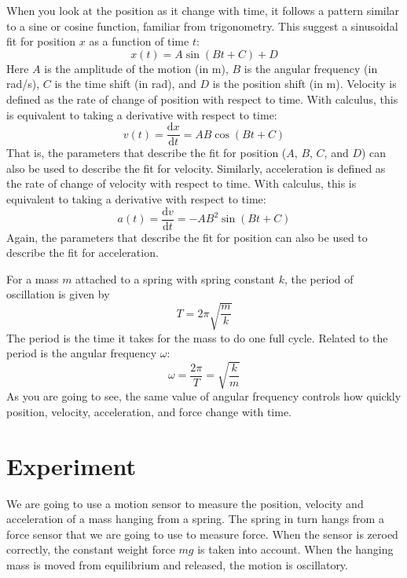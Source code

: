 When you look at the position as it change with time, it follows a pattern similar to a sine or cosine function, familiar from trigonometry. This suggest a sinusoidal fit for position $x$ as a function of time $t$:
\begin{equation}
    x(t) = A \sin{\left( Bt + C \right)} + D
\end{equation}
Here $A$ is the amplitude of the motion (in m), $B$ is the angular frequency (in rad/s), $C$ is the time shift (in rad), and $D$ is the position shift (in m). Velocity is defined as the rate of change of position with respect to time. With calculus, this is equivalent to taking a derivative with respect to time:
\begin{equation}
    v(t) = \frac{\mathrm{d} x}{\mathrm{d} t} = AB \cos{\left( Bt + C \right)}
    \label{eq.11.v}
\end{equation}
That is, the parameters that describe the fit for position ($A$, $B$, $C$, and $D$) can also be used to describe the fit for velocity. Similarly, acceleration is defined as the rate of change of velocity with respect to time. With calculus, this is equivalent to taking a derivative with respect to time:
\begin{equation}
    a(t) = \frac{\mathrm{d} v}{\mathrm{d} t} = -AB^{2} \sin{\left( Bt + C \right)}
    \label{eq.11.a}
\end{equation}
Again, the parameters that describe the fit for position can also be used to describe the fit for acceleration.

For a mass $m$ attached to a spring with spring constant $k$, the period of oscillation is given by
\begin{equation}
    T = 2\pi \sqrt{\frac{m}{k}}
\end{equation}
The period is the time it takes for the mass to do one full cycle. Related to the period is the angular frequency $\omega$:
\begin{equation}
    \omega = \frac{2 \pi}{T} = \sqrt{\frac{k}{m}}
    \label{eq.11.omega}
\end{equation}
As you are going to see, the same value of angular frequency controls how quickly position, velocity, acceleration, and force change with time.
\section{Experiment}
We are going to use a motion sensor to measure the position, velocity and acceleration of a mass hanging from a spring. The spring in turn hangs from a force sensor that we are going to use to measure force. When the sensor is zeroed correctly, the constant weight force $mg$ is taken into account. When the hanging mass is moved from equilibrium and released, the motion is oscillatory.

